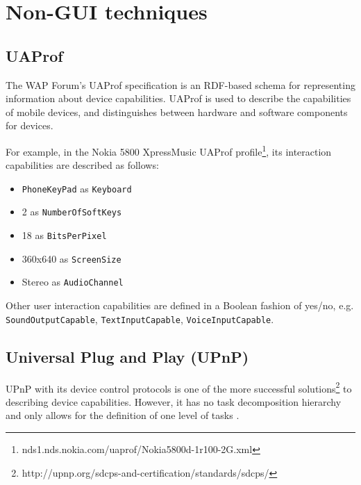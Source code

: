 \section{Non-GUI techniques}

\subsection{UAProf}

The WAP Forum's \ac{UAProf} specification is an \ac{RDF}-based schema for representing information about device capabilities. UAProf is used to describe the capabilities of mobile devices, and distinguishes between hardware and software components for devices.


For example, in the Nokia 5800 XpressMusic UAProf profile\footnote{nds1.nds.nokia.com/uaprof/Nokia5800d-1r100-2G.xml
}, its interaction capabilities are described as follows:

\begin{itemize}
	\item \texttt{PhoneKeyPad} as \texttt{Keyboard}
	\item 2 as \texttt{NumberOfSoftKeys}
	\item 18 as \texttt{BitsPerPixel}
	\item 360x640 as \texttt{ScreenSize}
	\item Stereo as \texttt{AudioChannel}
\end{itemize}

Other user interaction capabilities are defined in a Boolean fashion of yes/no, e.g. \texttt{SoundOutputCapable}, \texttt{TextInputCapable}, \texttt{Voice\-Input\-Capable}.

\subsection{Universal Plug and Play (UPnP)}
\label{UPnP}

\ac{UPnP} with its device control protocols is one of the more successful solutions\footnote{http://upnp.org/sdcps-and-certification/standards/sdcps/} to describing device capabilities. However, it has no task decomposition hierarchy and only allows for the definition of one level of tasks \cite{Niezen2010}.

